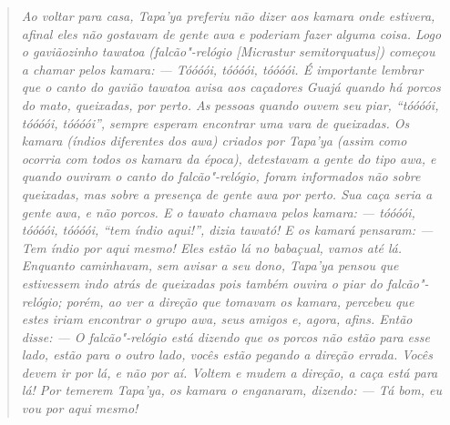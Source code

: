 \begin{quote}
\noindent
\emph{Ao voltar para casa, \emph{Tapa'ya} preferiu não dizer aos \emph{kamara}
onde estivera, afinal eles não gostavam de gente \emph{awa} e poderiam
fazer alguma coisa. Logo o gaviãozinho \emph{tawatoa} (falcão"-relógio
{[}Micrastur semitorquatus{]}) começou a chamar pelos \emph{kamara}:
--- Tóóóói, tóóóói, tóóóói. É importante lembrar que o canto do gavião
\emph{tawatoa} avisa aos caçadores Guajá quando há porcos do mato,
queixadas, por perto. As pessoas quando ouvem seu piar, ``tóóóói,
tóóóói, tóóóói'', sempre esperam encontrar uma vara de queixadas. Os
\emph{kamara} (índios diferentes dos \emph{awa}) criados por
\emph{Tapa'ya} (assim como ocorria com todos os \emph{kamara} da época),
detestavam a gente do tipo \emph{awa}, e quando ouviram o canto do
falcão"-relógio, foram informados não sobre queixadas, mas sobre a
presença de gente \emph{awa} por perto. Sua caça seria a gente
\emph{awa}, e não porcos. E o \emph{tawato} chamava pelos \emph{kamara}:
--- tóóóói, tóóóói, tóóóói, ``tem índio aqui!'', dizia \emph{tawató}! E os
\emph{kamará} pensaram: --- Tem índio por aqui mesmo! Eles estão lá no
babaçual, vamos até lá. Enquanto caminhavam, sem avisar a seu dono,
\emph{Tapa'ya} pensou que estivessem indo atrás de queixadas pois também
ouvira o piar do falcão"-relógio; porém, ao ver a direção que tomavam os
\emph{kamara}, percebeu que estes iriam encontrar o grupo \emph{awa},
seus amigos e, agora, afins. Então disse: --- O falcão"-relógio está dizendo
que os porcos não estão para esse lado, estão para o outro lado, vocês
estão pegando a direção errada. Vocês devem ir por lá, e não por aí.
Voltem e mudem a direção, a caça está para lá! Por temerem
\emph{Tapa'ya}, os \emph{kamara} o enganaram, dizendo: --- Tá bom, eu vou
por aqui mesmo!}


\end{quote}
